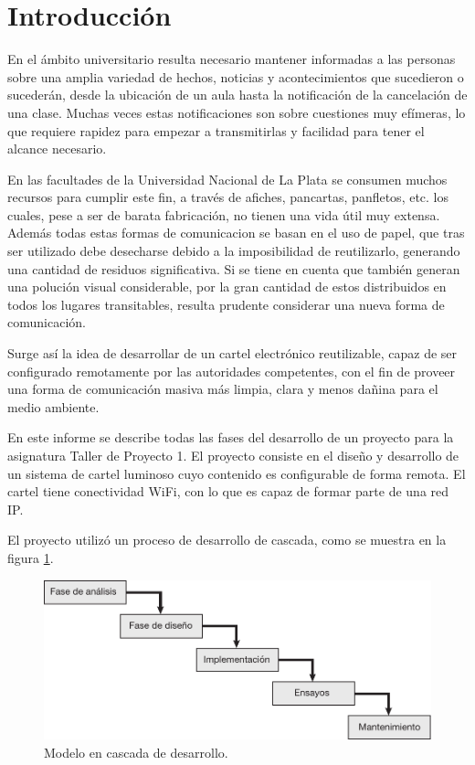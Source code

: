 \section{Introducción}
En el ámbito universitario resulta necesario mantener informadas a las personas sobre una amplia variedad de hechos, noticias y acontecimientos que sucedieron o sucederán, desde la ubicación de un aula hasta la notificación de la cancelación de una clase. Muchas veces estas notificaciones son sobre cuestiones muy efímeras, lo que requiere rapidez para empezar a transmitirlas y facilidad para tener el alcance necesario.

En las facultades de la Universidad Nacional de La Plata se consumen muchos recursos para cumplir este fin, a través de afiches, pancartas, panfletos, etc. los cuales, pese a ser de barata fabricación, no tienen una vida útil muy extensa. Además todas estas formas de comunicacion se basan en el uso de papel, que tras ser utilizado debe desecharse debido a la imposibilidad de reutilizarlo, generando una cantidad de residuos significativa. Si se tiene en cuenta que también generan una polución visual considerable, por la gran cantidad de estos distribuidos en todos los lugares transitables, resulta prudente considerar una nueva forma de comunicación.

Surge así la idea de desarrollar de un cartel electrónico reutilizable, capaz de ser configurado remotamente por las autoridades competentes, con el fin de proveer una forma de comunicación masiva más limpia, clara y menos dañina para el medio ambiente.

En este informe se describe todas las fases del desarrollo de un proyecto para la asignatura Taller de Proyecto 1. El proyecto consiste en el diseño y desarrollo de un sistema de cartel luminoso cuyo contenido es configurable de forma remota. El cartel tiene conectividad WiFi, con lo que es capaz de formar parte de una red IP.

El proyecto utilizó un proceso de desarrollo de cascada, como se muestra en la figura \ref{fig:waterfall}.

\begin{figure}[!ht]
	\centering
	\includegraphics[width=0.8\linewidth]{imagenes/waterfall.pdf}
	\caption{Modelo en cascada de desarrollo.}
	\label{fig:waterfall}
\end{figure}

